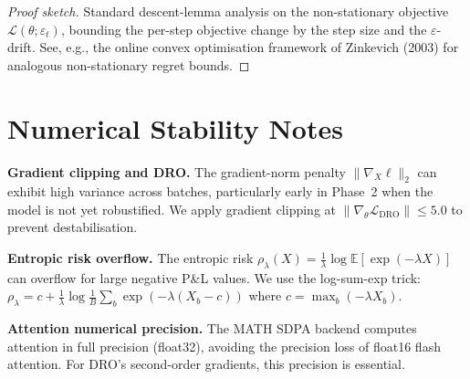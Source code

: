 \documentclass[11pt]{article}
\newcommand{\E}{\mathbb{E}}
\begin{document}
\begin{proof}[Proof sketch]
Standard descent-lemma analysis on the non-stationary objective $\mathcal{L}(\theta;\varepsilon_t)$, bounding the per-step objective change by the step size and the $\varepsilon$-drift.  See, e.g., the online convex optimisation framework of Zinkevich (2003) for analogous non-stationary regret bounds.
\end{proof}

\section{Numerical Stability Notes}
\label{app:numerical}

\textbf{Gradient clipping and DRO.}  The gradient-norm penalty $\|\nabla_X\ell\|_2$ can exhibit high variance across batches, particularly early in Phase~2 when the model is not yet robustified.  We apply gradient clipping at $\|\nabla_\theta\mathcal{L}_{\mathrm{DRO}}\| \le 5.0$ to prevent destabilisation.

\textbf{Entropic risk overflow.}  The entropic risk $\rho_\lambda(X) = \frac{1}{\lambda}\log\E[\exp(-\lambda X)]$ can overflow for large negative P\&L values.  We use the log-sum-exp trick: $\rho_\lambda = c + \frac{1}{\lambda}\log\frac{1}{B}\sum_b\exp(-\lambda(X_b - c))$ where $c = \max_b(-\lambda X_b)$.

\textbf{Attention numerical precision.}  The MATH SDPA backend computes attention in full precision (float32), avoiding the precision loss of float16 flash attention.  For DRO's second-order gradients, this precision is essential.
\end{document}
